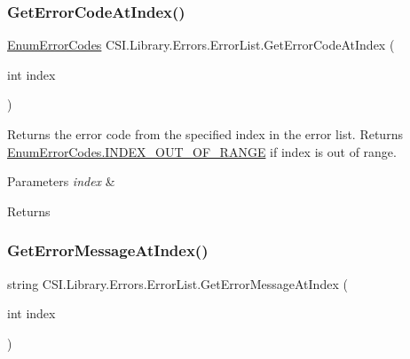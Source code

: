 \mbox{\label{class_c_s_i_1_1_library_1_1_errors_1_1_error_list_a0aa479114c9e50fc432b7fddae90f877}} 
\subsubsection{\texorpdfstring{GetErrorCodeAtIndex()}{GetErrorCodeAtIndex()}}
{\footnotesize\ttfamily \mbox{\hyperlink{namespace_c_s_i_1_1_library_1_1_errors_a5534735de1ef2256eb4c52c7440e30d7}{Enum\+Error\+Codes}} C\+S\+I.\+Library.\+Errors.\+Error\+List.\+Get\+Error\+Code\+At\+Index (\begin{DoxyParamCaption}\item[{int}]{index }\end{DoxyParamCaption})\hspace{0.3cm}{\ttfamily [inline]}}



Returns the error code from the specified index in the error list. Returns \mbox{\hyperlink{namespace_c_s_i_1_1_library_1_1_errors_a5534735de1ef2256eb4c52c7440e30d7a577cf42cc2eae1cffef0f749c6c08787}{Enum\+Error\+Codes.\+I\+N\+D\+E\+X\+\_\+\+O\+U\+T\+\_\+\+O\+F\+\_\+\+R\+A\+N\+GE}} if index is out of range. 


\begin{DoxyParams}{Parameters}
{\em index} & \\
\hline
\end{DoxyParams}
\begin{DoxyReturn}{Returns}

\end{DoxyReturn}
\mbox{\label{class_c_s_i_1_1_library_1_1_errors_1_1_error_list_a5b395f7a7a6c43878f28a2d1439f0bca}} 
\subsubsection{\texorpdfstring{GetErrorMessageAtIndex()}{GetErrorMessageAtIndex()}}
{\footnotesize\ttfamily string C\+S\+I.\+Library.\+Errors.\+Error\+List.\+Get\+Error\+Message\+At\+Index (\begin{DoxyParamCaption}\item[{int}]{index }\end{DoxyParamCaption})\hspace{0.3cm}{\ttfamily [inline]}}



